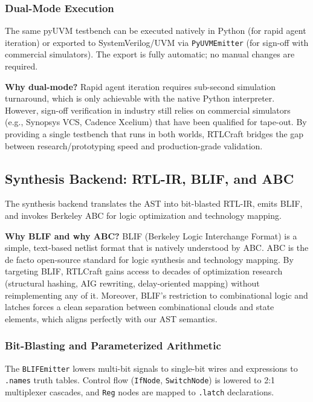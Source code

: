 \documentclass[11pt]{article}
\begin{document}
\subsubsection{Dual-Mode Execution}

The same pyUVM testbench can be executed natively in Python (for rapid agent iteration) or exported to SystemVerilog/UVM via \texttt{PyUVMEmitter} (for sign-off with commercial simulators). The export is fully automatic; no manual changes are required.

\textbf{Why dual-mode?} Rapid agent iteration requires sub-second simulation turnaround, which is only achievable with the native Python interpreter. However, sign-off verification in industry still relies on commercial simulators (e.g., Synopsys VCS, Cadence Xcelium) that have been qualified for tape-out. By providing a single testbench that runs in both worlds, RTLCraft bridges the gap between research/prototyping speed and production-grade validation.

\subsection{Synthesis Backend: RTL-IR, BLIF, and ABC}
\label{sec:synthesis}

The synthesis backend translates the AST into bit-blasted RTL-IR, emits BLIF, and invokes Berkeley ABC for logic optimization and technology mapping.

\textbf{Why BLIF and why ABC?} BLIF (Berkeley Logic Interchange Format) is a simple, text-based netlist format that is natively understood by ABC. ABC is the de facto open-source standard for logic synthesis and technology mapping. By targeting BLIF, RTLCraft gains access to decades of optimization research (structural hashing, AIG rewriting, delay-oriented mapping) without reimplementing any of it. Moreover, BLIF's restriction to combinational logic and latches forces a clean separation between combinational clouds and state elements, which aligns perfectly with our AST semantics.

\subsubsection{Bit-Blasting and Parameterized Arithmetic}

The \texttt{BLIFEmitter} lowers multi-bit signals to single-bit wires and expressions to \texttt{.names} truth tables. Control flow (\texttt{IfNode}, \texttt{SwitchNode}) is lowered to 2:1 multiplexer cascades, and \texttt{Reg} nodes are mapped to \texttt{.latch} declarations.
\end{document}
